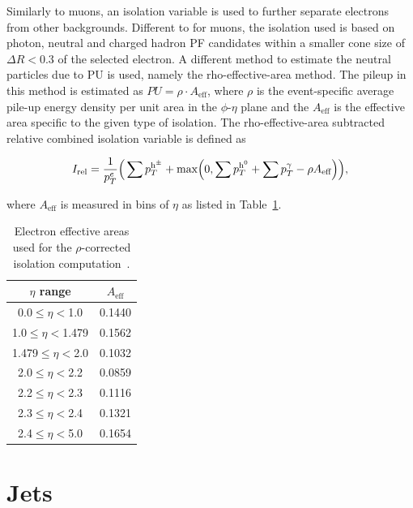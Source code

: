 Similarly to muons, an isolation variable is used to further separate electrons from other backgrounds.
Different to for muons, the isolation used is based on photon, neutral and charged hadron \ac{PF} candidates within a smaller cone size of $\Delta R<0.3$ of the selected electron.
A different method to estimate the neutral particles due to \ac{PU} is used, namely the rho-effective-area method. 
The pileup in this method is estimated as $PU=\rho\cdot A_{\text{eff}}$, where $\rho$ is the event-specific average pile-up energy density per unit area in the $\phi$-$\eta$ plane and the $A_{\text{eff}}$ is the effective area specific to the given type of isolation. 
The rho-effective-area subtracted relative combined isolation variable is defined as

\begin{equation}
\label{eqn:electron_reliso_rho}
I_{\text{rel}} = \frac{1}{p_{T}^{e}} \Big( \sum p_{T}^{\text{h}^{\pm}} + \text{max}\Big( 0, \sum p_{T}^{\text{h}^0} + \sum p_{T}^{\gamma} - \rho A_{\text{eff}} \Big) \Big),
\end{equation}

where $A_{\text{eff}}$ is measured in bins of $\eta$ as listed in Table~\ref{tab:EleEA}.

\begin{table}[htb]
\begin{center}
\begin{tabular}{|c|c|}
\hline
$\eta$ range & $A_{\text{eff}}$ \\
\hline
\hline
0.0$\leq\eta<$1.0   &  0.1440 \\
1.0$\leq\eta<$1.479 &  0.1562 \\
1.479$\leq\eta<$2.0 &  0.1032 \\
2.0$\leq\eta<$2.2   &  0.0859 \\
2.2$\leq\eta<$2.3   &  0.1116 \\
2.3$\leq\eta<$2.4   &  0.1321 \\
2.4$\leq\eta<$5.0   &  0.1654 \\
\hline
\end{tabular}
\end{center}
\caption{
 Electron effective areas used for the $\rho$-corrected isolation computation~\cite{CMS:2015xaf}.
}
\label{tab:EleEA}
\end{table}

\section{Jets}

